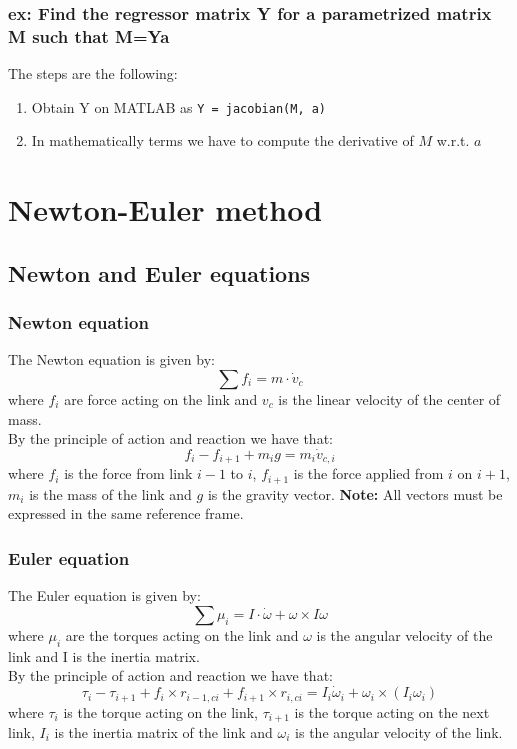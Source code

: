 \documentclass[a4paper,12pt]{article}
\begin{document}
\subsubsection{ex: Find the regressor matrix Y for a parametrized matrix M such that M=Ya}
The steps are the following:
\begin{enumerate}
    \item Obtain Y on MATLAB as \verb|Y = jacobian(M, a)|
    \item In mathematically terms we have to compute the 
    derivative of $M$ w.r.t. $a$
\end{enumerate}





\section{Newton-Euler method}
\subsection{Newton and Euler equations}
\subsubsection{Newton equation}
The Newton equation is given by:
\begin{equation}
    \sum{f}_i = m \cdot \dot{v}_c
\end{equation}
where $f_i$ are force acting on the link and $v_c$ is the
 linear velocity of the center of mass.\\
 By the principle of action and reaction we have that:
    \begin{equation}
        f_i -f_{i+1} +m_ig = m_i \dot{v}_{c,i}
    \end{equation}
    where $f_i$ is the force from link $i-1$ to $i$, $f_{i+1}$ is 
    the force applied from $i$ on $i+1$, $m_i$ is the mass of the 
    link and $g$ is the gravity vector.
    \textbf{Note:} All vectors must be expressed in the same 
    reference frame.
\subsubsection{Euler equation}
The Euler equation is given by:
\begin{equation}
    \sum{\mu}_i = I \cdot \dot{\omega} + \omega \times I \omega
\end{equation}
where $\mu_i$ are the torques acting on the link
 and $\omega$ is the angular velocity of the link and I
  is the inertia matrix.\\
  By the principle of action and reaction we have that:
    \begin{equation}
        \tau_i -\tau_{i+1} + f_i \times r_{i-1,ci} + f_{i+1} \times r_{i,ci} = I_i \dot{\omega}_i + \omega_i \times (I_i \omega_i)
    \end{equation}
    where $\tau_i$ is the torque acting on the link, $\tau_{i+1}$ is 
    the torque acting on the next link, $I_i$ is the inertia matrix of the 
    link and $\omega_i$ is the angular velocity of the link.
\end{document}
